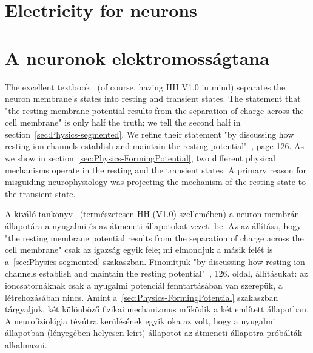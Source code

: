 
\ifx\magyar\undefined
\chapter[Electricity for neurons]{Electricity for neurons\label{ch:Electricity}}
\else
\chapter[A neuronok elektromosságtana]{A neuronok elektromosságtana\label{ch:Electricity}}
\fi
\iflatexml
\else
\minitoc
\fi

\ifx\magyar\undefined %
The excellent textbook~\cite{PrinciplesNeuralScience:2013} (of course, having \gls{HH} V1.0 in mind) separates the neuron membrane's states into resting and transient states. The statement that "the resting membrane potential results
from the separation of charge across the
cell membrane" is only half the truth; we tell the second half in section~\ref{sec:Physics-segmented}. 
We refine their statement "by discussing how resting ion channels
establish and maintain the resting potential"~\cite{PrinciplesNeuralScience:2013}, page 126.
As we show in section~\ref{sec:Physics-FormingPotential}, two different physical mechanisms
operate in the resting and the transient states. A primary reason for misguiding neurophysiology was projecting the mechanism of the resting state to the transient state.

\else %

A kiváló tankönyv~\cite{PrinciplesNeuralScience:2013}
(természetesen \gls{HH} (V1.0) szellemében) a neuron membrán
állapotára a nyugalmi és az átmeneti állapotokat vezeti be.
Az az állítása, hogy "the resting membrane potential results
from the separation of charge across the
cell membrane" csak az igazság egyik fele; mi elmondjuk a
másik felét is a~\ref{sec:Physics-segmented} szakaszban. 
Finomítjuk "by discussing how resting ion channels
establish and maintain the resting potential"~\cite{PrinciplesNeuralScience:2013}, 126. oldal,
állításukat: az ioncsatornáknak csak a nyugalmi potenciál 
fenntartásában van szerepük, a létrehozásában nincs. 
Amint a~\ref{sec:Physics-FormingPotential} szakaszban tárgyaljuk, 
két különböző fizikai mechanizmus működik a két említett állapotban. A neurofiziológia tévútra kerülésének egyik oka 
az volt, hogy a nyugalmi állapotban (lényegében helyesen leírt) állapotot az átmeneti állapotra próbálták alkalmazni.
\fi


